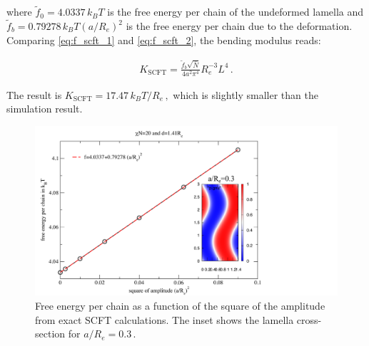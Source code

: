 \documentclass[bachelor,       %
               twoside,        %
               BCOR10mm,       %
               ngerman, english %
               ]{GAUBM}
\begin{document}
where $\tilde f_0=4.0337\,k_BT$ is the free energy per chain of the undeformed lamella and $\tilde f_b=0.79278\,k_BT(a/R_e)^2$ is the free energy per chain due to the deformation. Comparing \eqref{eq:f_scft_1} and \eqref{eq:f_scft_2}, the bending modulus reads:

\begin{align}
    K_\text{SCFT}=\frac{\tilde f_b\sqrt{\bar N}}{4a^2\pi^4}R_e^{-3}L^4\,.
\end{align}

The result is $K_\text{SCFT}=17.47\,k_BT/R_e\,,$ which is slightly smaller than the simulation result. 










\begin{figure}[h]
    \centering
    \includegraphics[width=0.6\linewidth]{figures/bend_scft.pdf}
    \caption{Free energy per chain as a function of the square of the amplitude from exact \ac{SCFT} calculations. The inset shows the lamella cross-section for $a/R_e=0.3\,.$}
    \label{fig:bend_scft}
\end{figure}
\end{document}
